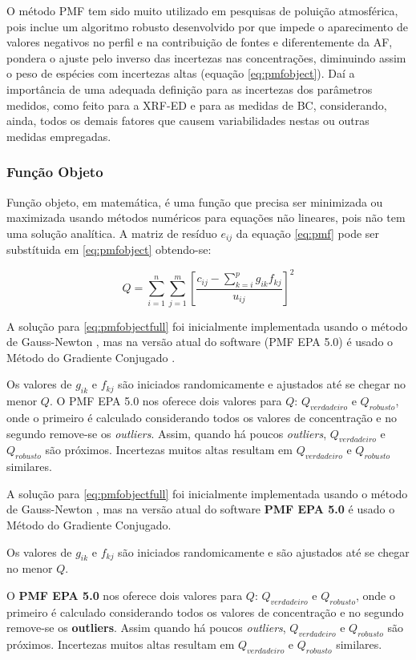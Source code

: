 O método PMF tem sido muito utilizado em pesquisas de poluição 
atmosférica, pois inclue um algoritmo robusto desenvolvido por \citep{paatero1994}
que impede o aparecimento de valores negativos no perfil e na contribuição de fontes
e diferentemente da AF, pondera o ajuste pelo inverso das incertezas nas 
concentrações, diminuindo assim o peso de espécies com incertezas altas 
(equação \ref{eq:pmfobject}).
Daí a importância de uma adequada definição para as incertezas dos parâmetros 
medidos, como feito para a XRF-ED e para as medidas de BC, considerando, ainda, 
todos os demais fatores que causem variabilidades nestas ou outras medidas 
empregadas.

\subsubsection{Função Objeto}

Função objeto, em matemática, é uma função que precisa ser minimizada 
ou maximizada usando métodos numéricos para equações não lineares, pois não 
tem uma solução analítica. A matriz de resíduo ${e_{ij}}$ da equação \ref{eq:pmf}
pode ser substítuida em \ref{eq:pmfobject} obtendo-se:

\begin{equation}
  Q = \sum_{i=1}^n \sum_{j=1}^m  \left[ \frac{c_{ij} - \sum_{k=i}^p g_{ik}f_{kj}} {u_{ij}} \right] ^2
  \label{eq:pmfobjectfull}
\end{equation}

A solução para \ref{eq:pmfobjectfull} foi inicialmente implementada usando 
o método de Gauss-Newton \citep{paatero1994}, mas na 
versão atual do software (PMF EPA 5.0) é usado o 
Método do Gradiente Conjugado \citep{norris2014}.

Os valores de $g_{ik}$ e $f_{kj}$ são iniciados randomicamente e
ajustados até se chegar no menor $Q$. O PMF EPA 5.0 nos oferece dois valores 
para $Q$: $Q_{verdadeiro}$ e 
$Q_{robusto}$, onde o primeiro é calculado considerando todos os valores 
de concentração e no segundo remove-se os \textit{outliers}.
Assim, quando há poucos \textit{outliers}, $Q_{verdadeiro}$ e $Q_{robusto}$ 
são próximos. Incertezas muitos altas resultam em $Q_{verdadeiro}$ e 
$Q_{robusto}$ similares.











A solução para \ref{eq:pmfobjectfull} foi inicialmente implementada usando 
o método de Gauss-Newton \citep{paatero1994}, mas na 
versão atual do software \textbf{PMF EPA 5.0} \citep{norris2014} é usado o Método do Gradiente Conjugado.

Os valores de $g_{ik}$ e $f_{kj}$ são iniciados randomicamente e
são ajustados até se chegar no menor $Q$.
 
O \textbf{PMF EPA 5.0} nos oferece dois valores para $Q$: $Q_{verdadeiro}$ e 
$Q_{robusto}$, onde o primeiro é calculado considerando todos os valores 
de concentração e no segundo remove-se os \textbf{outliers}.
Assim quando há poucos \textit{outliers}, $Q_{verdadeiro}$ e $Q_{robusto}$ 
são próximos. Incertezas muitos altas resultam em $Q_{verdadeiro}$ e 
$Q_{robusto}$ similares.


